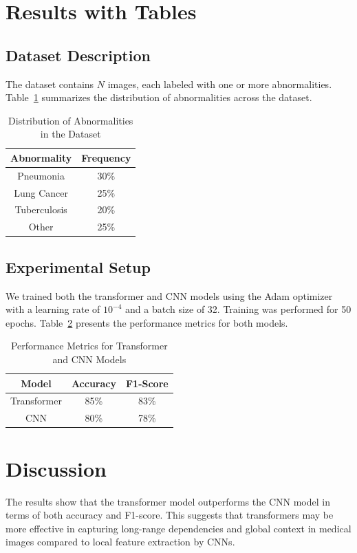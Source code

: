 \documentclass{article}
\begin{document}
\section{Results with Tables}
\subsection{Dataset Description}
The dataset contains $N$ images, each labeled with one or more abnormalities. Table~\ref{tab:dataset} summarizes the distribution of abnormalities across the dataset.

\begin{table}[ht]
\centering
\begin{tabular}{|c|c|}
\hline
Abnormality & Frequency \\
\hline
Pneumonia & 30\% \\
Lung Cancer & 25\% \\
Tuberculosis & 20\% \\
Other & 25\% \\
\hline
\end{tabular}
\caption{Distribution of Abnormalities in the Dataset}
\label{tab:dataset}
\end{table}

\subsection{Experimental Setup}
We trained both the transformer and CNN models using the Adam optimizer with a learning rate of $10^{-4}$ and a batch size of 32. Training was performed for 50 epochs. Table~\ref{tab:results} presents the performance metrics for both models.

\begin{table}[ht]
\centering
\begin{tabular}{|c|c|c|}
\hline
Model & Accuracy & F1-Score \\
\hline
Transformer & 85\% & 83\% \\
CNN & 80\% & 78\% \\
\hline
\end{tabular}
\caption{Performance Metrics for Transformer and CNN Models}
\label{tab:results}
\end{table}

\section{Discussion}
The results show that the transformer model outperforms the CNN model in terms of both accuracy and F1-score. This suggests that transformers may be more effective in capturing long-range dependencies and global context in medical images compared to local feature extraction by CNNs.
\end{document}
